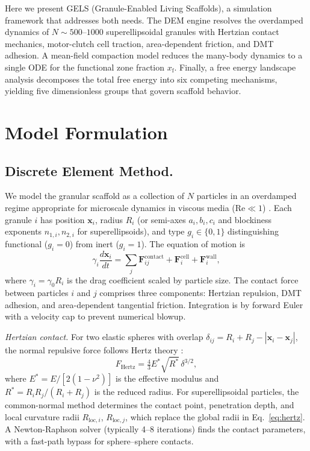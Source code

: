 \documentclass[9pt,twocolumn,twoside]{pnas-new}
\newcommand{\xf}{x_\mathrm{f}}
\begin{document}
Here we present GELS (Granule-Enabled Living
Scaffolds), a simulation framework that addresses
both needs. The DEM engine resolves the overdamped dynamics of $N \sim
500$--$1000$ superellipsoidal granules with Hertzian contact mechanics,
motor-clutch cell traction, area-dependent friction, and DMT adhesion. A
mean-field compaction model reduces the many-body dynamics to a single ODE
for the functional zone fraction $\xf$. Finally, a free energy landscape
analysis decomposes the total free energy into six competing mechanisms,
yielding five dimensionless groups that govern scaffold behavior.

\section*{Model Formulation}

\subsection*{Discrete Element Method.}

We model the granular scaffold as a collection of $N$ particles in an
overdamped regime appropriate for microscale dynamics in viscous media
($\mathrm{Re} \ll 1$) \cite{Purcell1977}. Each granule $i$ has position
$\mathbf{x}_i$, radius $R_i$ (or semi-axes $a_i, b_i, c_i$ and blockiness
exponents $n_{1,i}, n_{2,i}$ for superellipsoids), and type $g_i \in
\{0, 1\}$ distinguishing functional ($g_i = 0$) from inert ($g_i = 1$).
The equation of motion is
%
\begin{equation}\label{eq:eom}
  \gamma_i \frac{d\mathbf{x}_i}{dt} = \sum_j \mathbf{F}_{ij}^\mathrm{contact}
  + \mathbf{F}_i^\mathrm{cell} + \mathbf{F}_i^\mathrm{wall},
\end{equation}
%
where $\gamma_i = \gamma_0 R_i$ is the drag coefficient scaled by particle
size. The contact force between particles $i$ and $j$ comprises three
components: Hertzian repulsion, DMT adhesion, and area-dependent tangential
friction. Integration is by forward Euler with a velocity cap to prevent
numerical blowup.

\textit{Hertzian contact.}
For two elastic spheres with overlap $\delta_{ij} = R_i + R_j -
|\mathbf{x}_i - \mathbf{x}_j|$, the normal repulsive force follows Hertz
theory \cite{Johnson1985}:
%
\begin{equation}\label{eq:hertz}
  F_\mathrm{Hertz} = \tfrac{4}{3} E^{*} \sqrt{R^{*}}\, \delta^{3/2},
\end{equation}
%
where $E^{*} = E/[2(1 - \nu^2)]$ is the effective modulus and $R^{*} = R_i
R_j/(R_i + R_j)$ is the reduced radius. For superellipsoidal particles, the
common-normal method \cite{Delaney2010,Jaklic2000} determines the contact
point, penetration depth, and local curvature radii $R_{\mathrm{loc},i}$,
$R_{\mathrm{loc},j}$, which replace the global radii in Eq.~\ref{eq:hertz}.
A Newton-Raphson solver (typically 4--8 iterations) finds the contact
parameters, with a fast-path bypass for sphere--sphere contacts.
\end{document}
